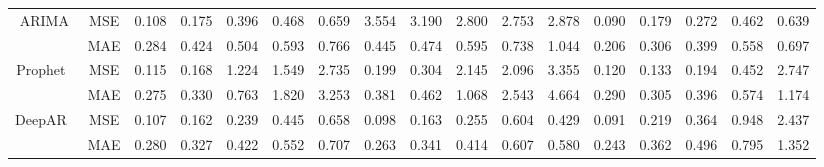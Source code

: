 \documentclass{article}
\begin{document}
\begin{table*}[htbp]
{\begin{tabular}{c|c|c|c|c|c|c|c|c|c|c|c|c|c|c|c|c}
\multirow{2}{*}{ARIMA}            & MSE                               & 0.108                & 0.175                & 0.396                & 0.468                & 0.659                & 3.554                & 3.190                & 2.800                & 2.753                & 2.878                & 0.090                & 0.179                & 0.272                & 0.462                & 0.639                \\  
                                  & MAE                               & 0.284                & 0.424                & 0.504                & 0.593                & 0.766                & 0.445                & 0.474                & 0.595                & 0.738                & 1.044                & 0.206                & 0.306                & 0.399                & 0.558                & 0.697                \\ \hline
\multirow{2}{*}{Prophet~\cite{Taylor2018ForecastingAS}}          & MSE                               & 0.115                & 0.168                & 1.224                & 1.549                & 2.735                & 0.199                & 0.304                & 2.145                & 2.096                & 3.355                & 0.120                & 0.133                & 0.194                & 0.452                & 2.747                \\  
                                  & MAE                               & 0.275                & 0.330                & 0.763                & 1.820                & 3.253                & 0.381                & 0.462                & 1.068                & 2.543                & 4.664                & 0.290                & 0.305                & 0.396                & 0.574                & 1.174                \\ \hline
\multirow{2}{*}{DeepAR~\cite{salinas2020deepar}}           & MSE                               & 0.107                & 0.162                & 0.239                & 0.445                & 0.658                & 0.098                & 0.163                & 0.255                & 0.604                & 0.429                & 0.091                & 0.219                & 0.364                & 0.948                & 2.437                \\  
                                  & MAE                               & 0.280                & 0.327                &0.422                & 0.552                & 0.707                & 0.263                & 0.341                & 0.414                & 0.607                & 0.580                & 0.243                & 0.362                & 0.496                & 0.795                & 1.352                \\ \hline

\end{tabular}}
\end{table*}
\end{document}
